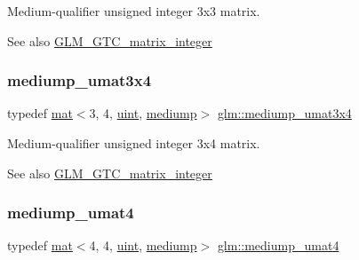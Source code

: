 Medium-\/qualifier unsigned integer 3x3 matrix. \begin{DoxySeeAlso}{See also}
\hyperlink{group__gtc__matrix__integer}{G\+L\+M\+\_\+\+G\+T\+C\+\_\+matrix\+\_\+integer} 
\end{DoxySeeAlso}
\mbox{\label{group__gtc__matrix__integer_ga22e32b4dcd60655044ebbd30f50a2e67}} 
\subsubsection{\texorpdfstring{mediump\+\_\+umat3x4}{mediump\_umat3x4}}
{\footnotesize\ttfamily typedef \hyperlink{structglm_1_1mat}{mat}$<$3, 4, \hyperlink{group__core__precision_ga4fd29415871152bfb5abd588334147c8}{uint}, \hyperlink{namespaceglm_a36ed105b07c7746804d7fdc7cc90ff25a6416f3ea0c9025fb21ed50c4d6620482}{mediump}$>$ \hyperlink{group__gtc__matrix__integer_ga22e32b4dcd60655044ebbd30f50a2e67}{glm\+::mediump\+\_\+umat3x4}}

Medium-\/qualifier unsigned integer 3x4 matrix. \begin{DoxySeeAlso}{See also}
\hyperlink{group__gtc__matrix__integer}{G\+L\+M\+\_\+\+G\+T\+C\+\_\+matrix\+\_\+integer} 
\end{DoxySeeAlso}
\mbox{\label{group__gtc__matrix__integer_ga0653e9571754f1e33203290aaf3dfc5d}} 
\subsubsection{\texorpdfstring{mediump\+\_\+umat4}{mediump\_umat4}}
{\footnotesize\ttfamily typedef \hyperlink{structglm_1_1mat}{mat}$<$4, 4, \hyperlink{group__core__precision_ga4fd29415871152bfb5abd588334147c8}{uint}, \hyperlink{namespaceglm_a36ed105b07c7746804d7fdc7cc90ff25a6416f3ea0c9025fb21ed50c4d6620482}{mediump}$>$ \hyperlink{group__gtc__matrix__integer_ga0653e9571754f1e33203290aaf3dfc5d}{glm\+::mediump\+\_\+umat4}}


